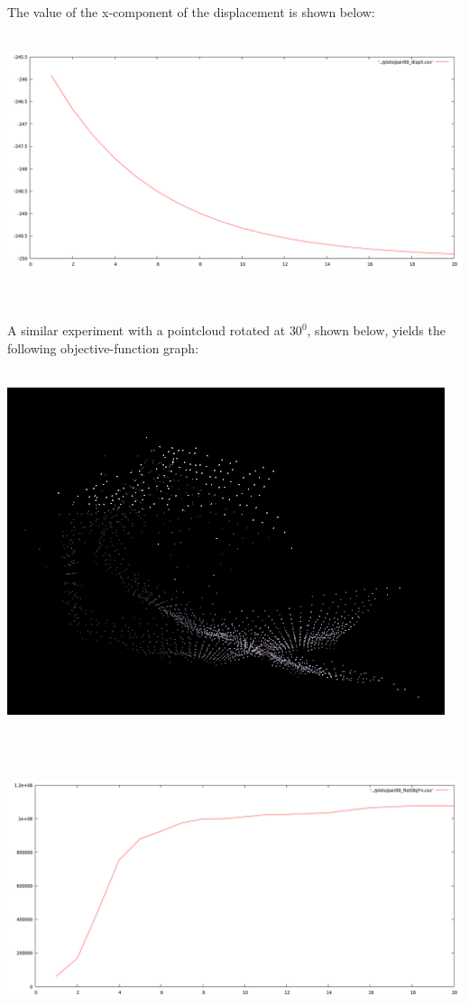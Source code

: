 \documentclass[11pt, a4paper]{article}
\begin{document}
The value of the x-component of the displacement is shown below: \\ \\
\centerline{\includegraphics[scale=0.35]{pair00_dispX}} \\ \\

\noindent A similar experiment with a pointcloud rotated at $30^0$, shown below, yields the following objective-function graph: \\ \\
\centerline{\includegraphics[scale=0.75]{rotSynthPair}}  \\ \\
\centerline{\includegraphics[scale=0.35]{pair00_rotObjFn}} \\ \\
\end{document}
